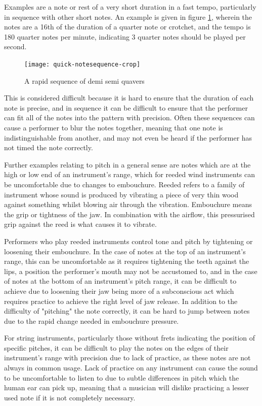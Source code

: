 Examples are a note or rest of a very short duration in a fast tempo, particularly in sequence with other short notes. An example is given in figure \ref{fig:notesequence}, wherein the notes are a 16th of the duration of a quarter note or crotchet, and the tempo is 180 quarter notes per minute, indicating 3 quarter notes should be played per second.

\begin{figure}[H]
\centering
\texttt{[image: quick-notesequence-crop]}
\caption{A rapid sequence of demi semi quavers}
\label{fig:notesequence}	
\end{figure}

 This is considered difficult because it is hard to ensure that the duration of each note is precise, and in sequence it can be difficult to ensure that the performer can fit all of the notes into the pattern with precision. Often these sequences can cause a performer to blur the notes together, meaning that one note is indistinguishable from another, and may not even be heard if the performer has not timed the note correctly.

Further examples relating to pitch in a general sense are notes which are at the high or low end of an instrument's range, which for reeded wind instruments can be uncomfortable due to changes to embouchure. Reeded refers to a family of instrument whose sound is produced by vibrating a piece of very thin wood against something whilst blowing air through the vibration. Embouchure means the grip or tightness of the jaw. In combination with the airflow, this pressurised grip against the reed is what causes it to vibrate.

Performers who play reeded instruments control tone and pitch by tightening or loosening their embouchure. In the case of notes at the top of an instrument's range, this can be uncomfortable as it requires tightening the teeth against the lips, a position the performer's mouth may not be accustomed to, and in the case of notes at the bottom of an instrument's pitch range, it can be difficult to achieve due to loosening their jaw being more of a subconscious act which requires practice to achieve the right level of jaw release. In addition to the difficulty of "pitching" the note correctly, it can be hard to jump between notes due to the rapid change needed in embouchure pressure.

For string instruments, particularly those without frets indicating the position of specific pitches, it can be difficult to play the notes on the edges of their instrument's range with precision due to lack of practice, as these notes are not always in common usage. Lack of practice on any instrument can cause the sound to be uncomfortable to listen to due to subtle differences in pitch which the human ear can pick up, meaning that a musician will dislike practicing a lesser used note if it is not completely necessary.

